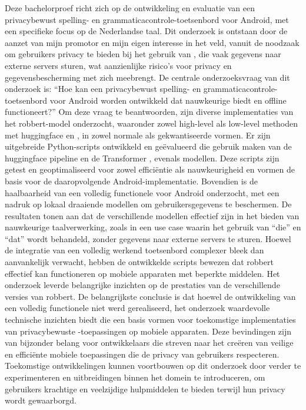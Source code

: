 Deze bachelorproef richt zich op de ontwikkeling en evaluatie van een privacybewust spelling- en grammaticacontrole-toetsenbord voor Android, met een specifieke focus op de Nederlandse taal. Dit onderzoek is ontstaan door de aanzet van mijn promotor en mijn eigen interesse in het veld, vanuit de noodzaak om gebruikers privacy te bieden bij het gebruik van , die vaak gegevens naar externe servers sturen, wat aanzienlijke risico's voor privacy en gegevensbescherming met zich meebrengt.
De centrale onderzoeksvraag van dit onderzoek is: ``Hoe kan een privacybewust spelling- en grammaticacontrole-toetsenbord voor Android worden ontwikkeld dat nauwkeurige  biedt en offline functioneert?'' Om deze vraag te beantwoorden, zijn diverse implementaties van het \gls{robbert}-model onderzocht, waaronder zowel high-level als low-level methoden met \gls{huggingface} en , in zowel normale als gekwantiseerde vormen. Er zijn uitgebreide Python-scripts ontwikkeld en geëvalueerd die gebruik maken van de \gls{huggingface} pipeline en de Transformer , evenals  modellen. Deze scripts zijn getest en geoptimaliseerd voor zowel efficiëntie als nauwkeurigheid en vormen de basis voor de daaropvolgende Android-implementatie. Bovendien is de haalbaarheid van een volledig functionele  voor Android onderzocht, met een nadruk op lokaal draaiende modellen om gebruikersgegevens te beschermen.
De resultaten tonen aan dat de verschillende modellen effectief zijn in het bieden van nauwkeurige taalverwerking, zoals in een use case waarin het gebruik van ``die'' en ``dat'' wordt behandeld, zonder gegevens naar externe servers te sturen. Hoewel de integratie van een volledig werkend toetsenbord complexer bleek dan aanvankelijk verwacht, hebben de ontwikkelde scripts bewezen dat \gls{robbert} effectief kan functioneren op mobiele apparaten met beperkte middelen. Het onderzoek leverde belangrijke inzichten op de prestaties van de verschillende versies van \gls{robbert}.
De belangrijkste conclusie is dat hoewel de ontwikkeling van een volledig functionele  niet werd gerealiseerd, het onderzoek waardevolle technische inzichten biedt die een basis vormen voor toekomstige implementaties van privacybewuste -toepassingen op mobiele apparaten. Deze bevindingen zijn van bijzonder belang voor ontwikkelaars die streven naar het creëren van veilige en efficiënte mobiele toepassingen die de privacy van gebruikers respecteren. Toekomstige ontwikkelingen kunnen voortbouwen op dit onderzoek door verder te experimenteren en uitbreidingen binnen het domein te introduceren, om gebruikers krachtige en veelzijdige hulpmiddelen te bieden terwijl hun privacy wordt gewaarborgd.

